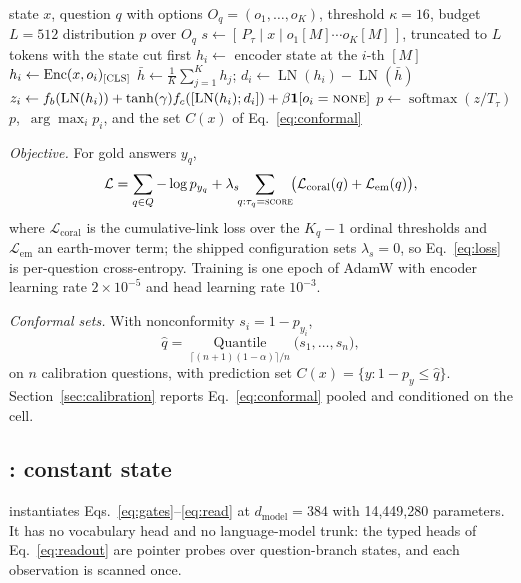 \begin{algorithm}[t]
\caption{Answering one typed question with \vsix{}.}
\label{alg:answer}
\begin{algorithmic}[1]
\Require state $x$, question $q$ with options $O_q=(o_1,\dots,o_K)$, threshold $\kappa=16$, budget $L=512$
\Ensure distribution $p$ over $O_q$
  \State $s\gets[\,P_\tau\mid x\mid o_1[M]\cdots o_K[M]\,]$, truncated to $L$ tokens with the state cut first
  \State $h_i\gets$ encoder state at the $i$-th $[M]$ 
\Else
    \State $h_i\gets\operatorname{Enc}(x,o_i)_{\textsc{[CLS]}}$ 
  \EndFor
  \State $\bar h\gets\tfrac{1}{K}\sum_{j=1}^{K}h_j$; \quad $d_i\gets\operatorname{LN}(h_i)-\operatorname{LN}(\bar h)$
  \State $z_i\gets f_b(\operatorname{LN}(h_i))+\tanh(\gamma)f_c([\operatorname{LN}(h_i);d_i])+\beta\mathbf{1}[o_i=\textsc{none}]$
\EndIf
\State $p\gets\operatorname{softmax}(z/T_\tau)$ 
\State \Return $p$, \,$\arg\max_i p_i$, and the set $C(x)$ of Eq.~\eqref{eq:conformal}
\end{algorithmic}
\end{algorithm}

\emph{Objective.} For gold answers $y_q$,
\begin{multline}
\mathcal{L} = \sum_{q\in Q} -\log p_{y_q}
 + \lambda_s \!\!\sum_{q:\tau_q=\textsc{score}}\!\! \big(\mathcal{L}_{\text{coral}}(q)
 + \mathcal{L}_{\text{em}}(q)\big), \label{eq:loss}
\end{multline}
where $\mathcal{L}_{\text{coral}}$ is the cumulative-link loss over the $K_q-1$ ordinal thresholds
and $\mathcal{L}_{\text{em}}$ an earth-mover term; the shipped configuration sets $\lambda_s=0$, so
Eq.~\eqref{eq:loss} is per-question cross-entropy. Training is one epoch of AdamW with encoder
learning rate $2\times10^{-5}$ and head learning rate $10^{-3}$.

\emph{Conformal sets.} With nonconformity $s_i=1-p_{y_i}$,
\begin{equation}
\hat q = \operatorname*{Quantile}_{\lceil (n+1)(1-\alpha)\rceil/n}\big(s_1,\dots,s_n\big),
\label{eq:conformal}
\end{equation}
on $n$ calibration questions, with prediction set $C(x)=\{y:1-p_y\le\hat q\}$. Section~\ref{sec:calibration} reports
Eq.~\eqref{eq:conformal} pooled and conditioned on the cell.

\subsection{\stream{}: constant state}
\stream{} instantiates Eqs.~\eqref{eq:gates}--\eqref{eq:read} at $d_{\text{model}}=384$ with
14{,}449{,}280 parameters. It has no vocabulary head and no language-model trunk: the typed heads of
Eq.~\eqref{eq:readout} are pointer probes over question-branch states, and each observation is
scanned once.


